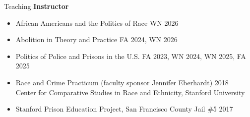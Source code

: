 \documentclass{resume} %
\begin{document}
\begin{rSection} {Teaching}
{\bf Instructor}
\begin{itemize}
\item  African Americans and the Politics of Race \hfill WN 2026
 \item Abolition in Theory and Practice \hfill FA 2024, WN 2026
 \item Politics of Police and Prisons in the U.S. \hfill FA 2023, WN 2024, WN 2025, FA 2025
    \item Race and Crime Practicum (faculty sponsor Jennifer Eberhardt) \hfill 2018\\
    Center for Comparative Studies in Race and Ethnicity, Stanford University
    \item Stanford Prison Education Project, San Francisco County Jail \#5 \hfill 2017\\
\end{itemize}



\end{rSection}


\end{document}
